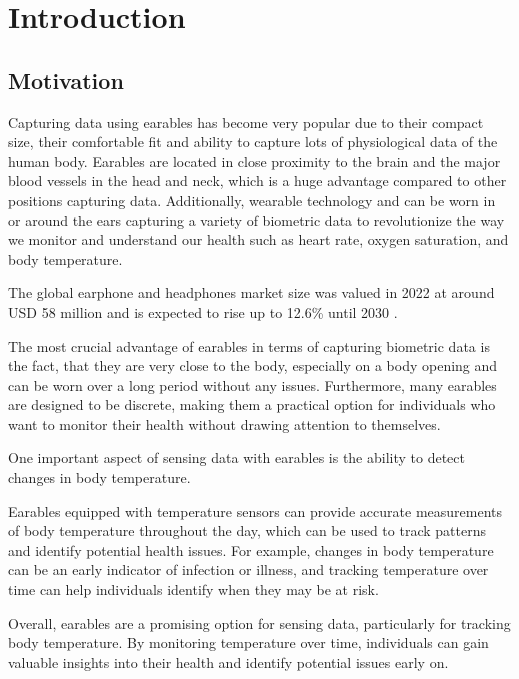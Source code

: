 
\chapter{Introduction}
\label{ch:Introduction}

\section{Motivation}
Capturing data using earables has become very popular due to their compact size, their comfortable fit and ability to capture lots of physiological data of the human body. 
Earables are located in close proximity to the brain and the major blood vessels in the head and neck, which is a huge advantage compared to other positions capturing data.
Additionally, wearable technology and can be worn in or around the ears capturing a variety of biometric data to revolutionize the way we monitor and understand our health such as heart rate, oxygen saturation, and body temperature.

The global earphone and headphones market size was valued in 2022 at around USD 58 million and is expected to rise up to 12.6\% until 2030 \cite{GlobalEarphonesHeadphones}.

The most crucial advantage of earables in terms of capturing biometric data is the fact, that they are very close to the body, especially on a body opening and can be worn over a long period without any issues. 
Furthermore, many earables are designed to be discrete, making them a practical option for individuals who want to monitor their health without drawing attention to themselves.

One important aspect of sensing data with earables is the ability to detect changes in body temperature. 

Earables equipped with temperature sensors can provide accurate measurements of body temperature throughout the day, which can be used to track patterns and identify potential health issues. 
For example, changes in body temperature can be an early indicator of infection or illness, and tracking temperature over time can help individuals identify when they may be at risk.

Overall, earables are a promising option for sensing data, particularly for tracking body temperature. 
By monitoring temperature over time, individuals can gain valuable insights into their health and identify potential issues early on.

